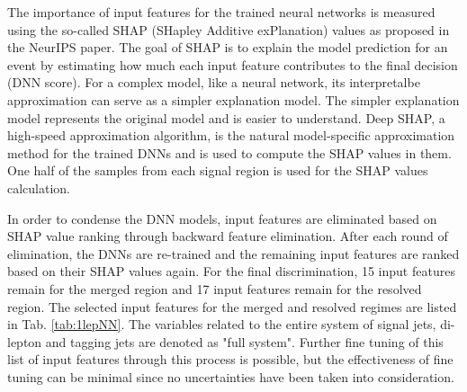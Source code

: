 The importance of input features for the trained neural networks is measured using the so-called SHAP (SHapley Additive exPlanation) values as proposed in the NeurIPS paper. 
The goal of SHAP is to explain the model prediction for an event by estimating how much each input feature contributes to the final decision (DNN score).
For a complex model, like a neural network, its interpretalbe approximation can serve as a simpler explanation model. The simpler explanation model represents the original model and is easier to understand. 
Deep SHAP, a high-speed approximation algorithm, is the natural model-specific approximation method for the trained DNNs and is used to compute the SHAP values in them. 
One half of the samples from each signal region is used for the SHAP values calculation.

In order to condense the DNN models, input features are eliminated based on SHAP value ranking through backward feature elimination. After each round of elimination, the DNNs are re-trained and the remaining input features are ranked based on their SHAP values again. For the final discrimination, 15 input features remain for the merged region and 17 input features remain for the resolved region. The selected input features for the merged and resolved regimes are listed in Tab. \ref{tab:1lepNN}. The variables related to the entire system of signal jets, di-lepton and tagging jets are denoted as "full system". Further fine tuning of this list of input features through this process is possible, but the effectiveness of fine tuning can be minimal since no uncertainties have been taken into consideration.

